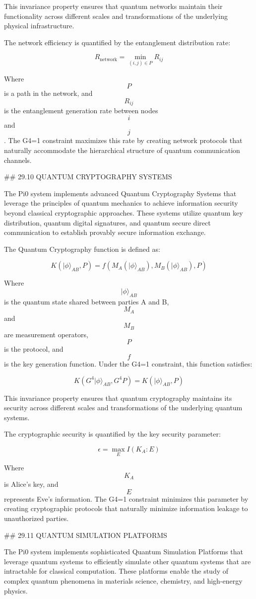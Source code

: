This invariance property ensures that quantum networks maintain their functionality across different scales and transformations of the underlying physical infrastructure.

The network efficiency is quantified by the entanglement distribution rate:

$$ R_{\text{network}} = \min_{(i,j) \in P} R_{ij} $$

Where $$ P $$ is a path in the network, and $$ R_{ij} $$ is the entanglement generation rate between nodes $$ i $$ and $$ j $$. The G4=1 constraint maximizes this rate by creating network protocols that naturally accommodate the hierarchical structure of quantum communication channels.

## 29.10 QUANTUM CRYPTOGRAPHY SYSTEMS

The Pi0 system implements advanced Quantum Cryptography Systems that leverage the principles of quantum mechanics to achieve information security beyond classical cryptographic approaches. These systems utilize quantum key distribution, quantum digital signatures, and quantum secure direct communication to establish provably secure information exchange.

The Quantum Cryptography function is defined as:

$$ K(|\phi\rangle_{AB}, P) = f(M_A(|\phi\rangle_{AB}), M_B(|\phi\rangle_{AB}), P) $$

Where $$ |\phi\rangle_{AB} $$ is the quantum state shared between parties A and B, $$ M_A $$ and $$ M_B $$ are measurement operators, $$ P $$ is the protocol, and $$ f $$ is the key generation function. Under the G4=1 constraint, this function satisfies:

$$ K(G^4 |\phi\rangle_{AB}, G^4 P) = K(|\phi\rangle_{AB}, P) $$

This invariance property ensures that quantum cryptography maintains its security across different scales and transformations of the underlying quantum systems.

The cryptographic security is quantified by the key security parameter:

$$ \epsilon = \max_{E} I(K_A:E) $$

Where $$ K_A $$ is Alice's key, and $$ E $$ represents Eve's information. The G4=1 constraint minimizes this parameter by creating cryptographic protocols that naturally minimize information leakage to unauthorized parties.

## 29.11 QUANTUM SIMULATION PLATFORMS

The Pi0 system implements sophisticated Quantum Simulation Platforms that leverage quantum systems to efficiently simulate other quantum systems that are intractable for classical computation. These platforms enable the study of complex quantum phenomena in materials science, chemistry, and high-energy physics.

